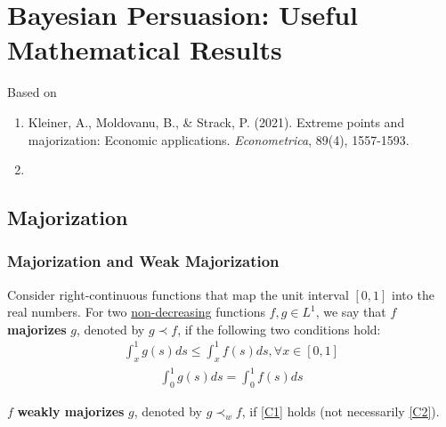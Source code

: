 \documentclass[11pt]{elegantbook}
\begin{document}
\chapter{Bayesian Persuasion: Useful Mathematical Results}
Based on
\begin{enumerate}[$\circ$]
    \item Kleiner, A., Moldovanu, B., \& Strack, P. (2021). Extreme points and majorization: Economic applications. \textit{Econometrica}, 89(4), 1557-1593.
    \item 
\end{enumerate}

\section{Majorization}
\subsection{Majorization and Weak Majorization}
\begin{definition}[Majorization]
    \normalfont
    Consider right-continuous functions that map the unit interval $[0,1]$ into the real numbers. For two \underline{non-decreasing} functions $f,g \in L^1$, we say that $f$ \textbf{majorizes} $g$, denoted by $g \prec f$, if the following two conditions hold:
    \begin{equation}
        \begin{aligned}
            \int_x^1 g(s)ds\leq \int_x^1 f(s)ds,\forall x\in [0,1]
        \end{aligned}
        \tag{Condition 1}
        \label{C1}
    \end{equation}
    \begin{equation}
        \begin{aligned}
            \int_0^1 g(s)ds=\int_0^1 f(s)ds
        \end{aligned}
        \tag{Condition 2}
        \label{C2}
    \end{equation}
\end{definition}

\begin{definition}
    \normalfont
    $f$ \textbf{weakly majorizes} $g$, denoted by $g \prec_w f$, if \ref{C1} holds (not necessarily \ref{C2}).
\end{definition}
\end{document}
